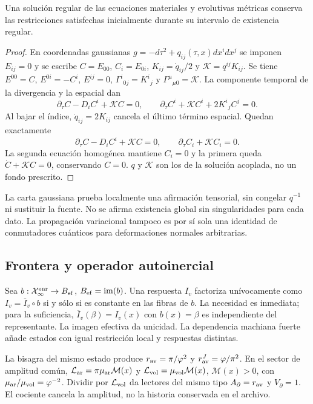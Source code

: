 \begin{proposition}
\label{hmtcuatro:gea:propagacion}
Una solución regular de las ecuaciones materiales y evolutivas
métricas conserva las restricciones satisfechas inicialmente
durante su intervalo de existencia regular.
\end{proposition}
\begin{proof}
En coordenadas gaussianas
$g=-d\tau^2+q_{ij}(\tau,x)dx^idx^j$ se imponen $E_{ij}=0$ y
se escribe
$C=E_{00}$, $C_i=E_{0i}$,
$K_{ij}=\dot q_{ij}/2$ y $\mathcal K=q^{ij}K_{ij}$.
Se tiene $E^{00}=C$, $E^{0i}=-C^i$, $E^{ij}=0$,
$\Gamma^i{}_{0j}=K^i{}_j$ y
$\Gamma^\mu{}_{\mu0}=\mathcal K$.
La componente temporal de la divergencia y la espacial dan
\[
\partial_\tau C-D_iC^i+\mathcal KC=0,\qquad
\partial_\tau C^i+\mathcal KC^i+2K^i{}_jC^j=0.
\]
Al bajar el índice, $\dot q_{ij}=2K_{ij}$ cancela el último
término espacial. Quedan exactamente
\begin{equation}
\partial_\tau C-D_iC^i+\mathcal KC=0,\qquad
\partial_\tau C_i+\mathcal KC_i=0.
\label{hmtcuatro:gea:propagacion-sistema}
\end{equation}
La segunda ecuación homogénea mantiene $C_i=0$ y la primera
queda $\dot C+\mathcal KC=0$, conservando $C=0$.
$q$ y $\mathcal K$ son los de la solución acoplada, no un fondo prescrito.
\end{proof}
La carta gaussiana prueba localmente una afirmación tensorial,
sin congelar $q^{-1}$ ni sustituir la fuente.
No se afirma existencia global sin singularidades para cada dato.
La propagación variacional tampoco es por sí sola una identidad
de conmutadores cuánticos para deformaciones normales arbitrarias.

\subsection{Frontera y operador autoinercial}
\label{hmtcuatro:gea:autoinercia}

Sea $b:\mathcal X_\infty^{\rm enr}\to B_{\rm ef}$,
$B_{\rm ef}=\operatorname{im}(b)$.
Una respuesta $I_v$ factoriza unívocamente como
$I_v=\overline I_v\circ b$ si y sólo si es constante en las
fibras de $b$. La necesidad es inmediata; para la suficiencia,
$\overline I_v(\beta)=I_v(x)$ con $b(x)=\beta$ es independiente
del representante. La imagen efectiva da unicidad.
La dependencia machiana fuerte añade estados con igual restricción
local y respuestas distintas.

La bisagra del mismo estado produce
$r_{\rm av}=\pi/\varphi^2$ y $r_{\rm av}^J=\varphi/\pi^2$.
En el sector de amplitud común,
$\mathcal L_{\rm ar}=\pi\mu_{\rm ar}\mathcal M(x)$ y
$\mathcal L_{\rm vol}=\mu_{\rm vol}\mathcal M(x)$,
$\mathcal M(x)>0$, con
$\mu_{\rm ar}/\mu_{\rm vol}=\varphi^{-2}$.
Dividir por $\mathcal L_{\rm vol}$ da lectores del mismo tipo
$A_\partial=r_{\rm av}$ y $V_\partial=1$.
El cociente cancela la amplitud, no la historia conservada en el archivo.

